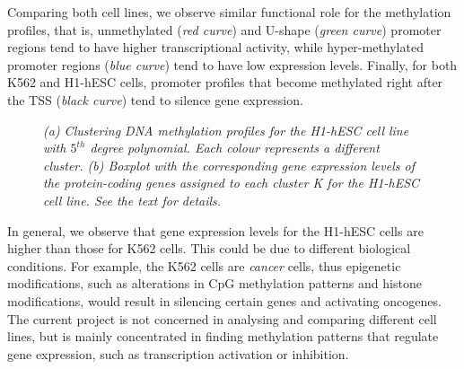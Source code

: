 Comparing both cell lines, we observe similar functional role for the methylation profiles, that is, unmethylated (\emph{red curve}) and U-shape (\emph{green curve}) promoter regions tend to have higher transcriptional activity, while hyper-methylated promoter regions (\emph{blue curve}) tend to have low expression levels. Finally, for both K562 and H1-hESC cells, promoter profiles that become methylated right after the TSS (\emph{black curve}) tend to silence gene expression. 
\begin{figure}[ht!]
     \begin{center}
    \end{center}
    \caption{\emph{(a) Clustering DNA methylation profiles for the H1-hESC cell line with $5^{th}$ degree polynomial. Each colour represents a different cluster. (b) Boxplot with the corresponding gene expression levels of the protein-coding genes assigned to each cluster K for the H1-hESC cell line. See the text for details.}}
   \label{meth-H1-pic}
\end{figure}

In general, we observe that gene expression levels for the H1-hESC cells are higher than those for K562 cells. This could be due to different biological conditions. For example, the K562 cells are \emph{cancer} cells, thus epigenetic modifications, such as alterations in CpG methylation patterns and histone modifications, would result in silencing certain genes and activating oncogenes. The current project is not concerned in analysing and comparing different cell lines, but is mainly concentrated in finding methylation patterns that regulate gene expression, such as transcription activation or inhibition. 